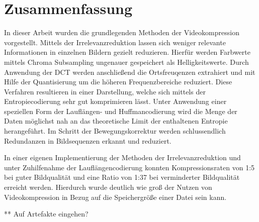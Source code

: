\chapter{Zusammenfassung}
\label{kap:Zusammenfassung}

In dieser Arbeit wurden die grundlegenden Methoden der Videokompression vorgestellt. Mittels der Irrelevanzreduktion lassen sich weniger relevante Informationen in einzelnen Bildern gezielt reduzieren. Hierfür werden Farbwerte mittels Chroma Subsampling ungenauer gespeichert als Helligkeitswerte. Durch Anwendung der DCT werden anschließend die Ortsfreuqenzen extrahiert und mit Hilfe der Quantisierung um die höheren Frequenzbereiche reduziert. Diese Verfahren resultieren in einer Darstellung, welche sich mittels der Entropiecodierung sehr gut komprimieren lässt. Unter Anwendung einer speziellen Form der Lauflängen- und Huffmancodierung wird die Menge der Daten möglichst nah an das theoretische Limit der enthaltenen Entropie herangeführt. Im Schritt der Bewegungskorrektur werden schlussendlich Redundanzen in Bildsequenzen erkannt und reduziert.

In einer eigenen Implementierung der Methoden der Irrelevanzreduktion und unter Zuhilfenahme der Lauflängencodierung konnten Kompressionsraten von 1:5 bei guter Bildqualität und eine Ratio von 1:37 bei verminderter Bildqualität erreicht werden. Hierdurch wurde deutlich wie groß der Nutzen von Videokompression in Bezug auf die Speichergröße einer Datei sein kann.

** Auf Artefakte eingehen?
